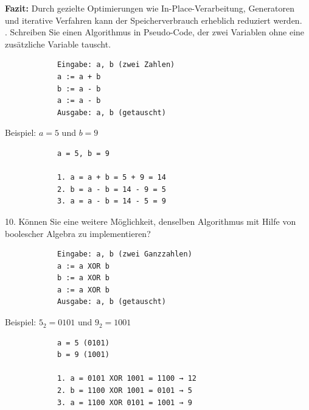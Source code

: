 \documentclass[a4paper,12pt]{article}
\begin{document}
		\textbf{Fazit:}  
		Durch gezielte Optimierungen wie In-Place-Verarbeitung, Generatoren und iterative Verfahren kann der Speicherverbrauch erheblich reduziert werden.\\
		. Schreiben Sie einen Algorithmus in Pseudo-Code, der zwei Variablen ohne eine zusätzliche Variable tauscht.
		\begin{verbatim}
			Eingabe: a, b (zwei Zahlen)
			a := a + b
			b := a - b
			a := a - b
			Ausgabe: a, b (getauscht)
		\end{verbatim}
		Beispiel: $a=5$ und $b=9$
		\begin{verbatim}
			a = 5, b = 9
			
			1. a = a + b = 5 + 9 = 14
			2. b = a - b = 14 - 9 = 5
			3. a = a - b = 14 - 5 = 9
		\end{verbatim}
		10. Können Sie eine weitere Möglichkeit, denselben Algorithmus mit Hilfe von boolescher Algebra zu implementieren?\\
		\begin{verbatim}
			Eingabe: a, b (zwei Ganzzahlen)
			a := a XOR b
			b := a XOR b
			a := a XOR b
			Ausgabe: a, b (getauscht)
		\end{verbatim}
		Beispiel: $5_2 = 0101$  und $9_2 = 1001$
		\begin{verbatim}
			a = 5 (0101)
			b = 9 (1001)
			
			1. a = 0101 XOR 1001 = 1100 → 12
			2. b = 1100 XOR 1001 = 0101 → 5
			3. a = 1100 XOR 0101 = 1001 → 9
		\end{verbatim}

		
\end{document}
